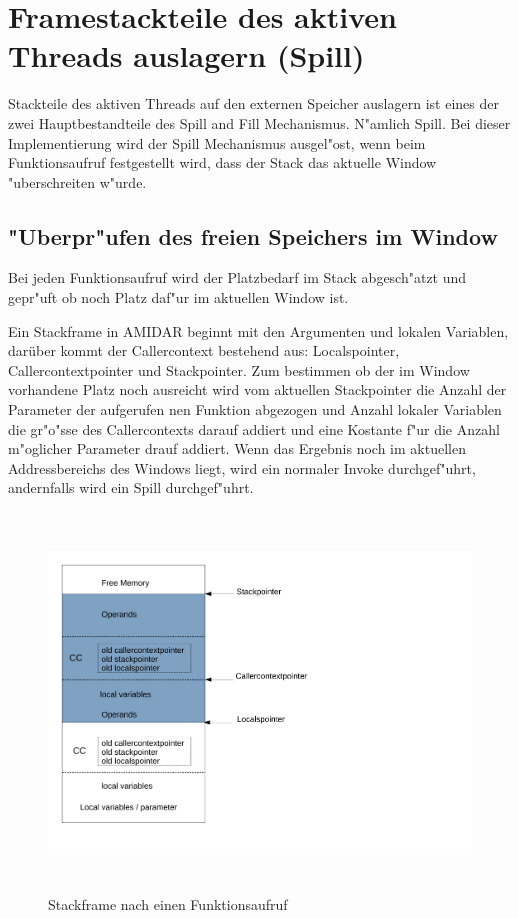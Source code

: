 \section{Framestackteile des aktiven Threads auslagern (Spill)}

Stackteile des aktiven Threads auf den externen Speicher auslagern ist eines der zwei Hauptbestandteile des Spill and Fill Mechanismus. N"amlich Spill. Bei dieser Implementierung wird der Spill Mechanismus ausgel"ost, wenn beim Funktionsaufruf festgestellt wird, dass der Stack das aktuelle Window "uberschreiten w"urde.

\subsection{"Uberpr"ufen des freien Speichers im Window}
Bei jeden Funktionsaufruf wird der Platzbedarf im Stack abgesch"atzt und gepr"uft ob noch Platz daf"ur im aktuellen Window ist. 

Ein Stackframe in AMIDAR beginnt mit den Argumenten und lokalen Variablen, darüber kommt der Callercontext bestehend aus: Localspointer, Callercontextpointer und Stackpointer. Zum bestimmen ob der im Window vorhandene Platz noch ausreicht wird vom aktuellen Stackpointer die Anzahl der Parameter der aufgerufen nen Funktion abgezogen und Anzahl lokaler Variablen die gr"o{"ss}e des Callercontexts darauf addiert und eine Kostante f"ur die Anzahl m"oglicher Parameter drauf addiert. Wenn das Ergebnis noch im aktuellen Addressbereichs des Windows liegt, wird ein normaler Invoke durchgef"uhrt, andernfalls wird ein Spill durchgef"uhrt. 

\begin{figure}
	\centering
	\includegraphics[height = 10cm]{PS_RS_graphics/Stackframe after Invoke.pdf}
	\caption{Stackframe nach einen Funktionsaufruf}
\end{figure}

